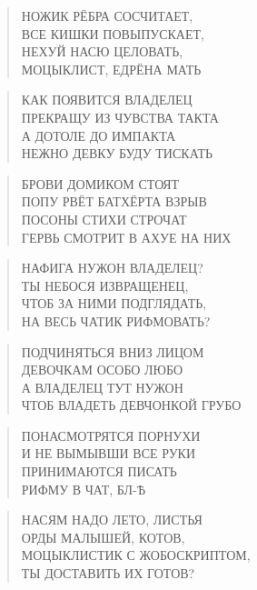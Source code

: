 \poemtitle{***}
\begin{verse}
НОЖИК РЁБРА СОСЧИТАЕТ,\\
ВСЕ КИШКИ ПОВЫПУСКАЕТ,\\
НЕХ⁠УЙ НАСЮ ЦЕЛОВАТЬ,\\
МОЦЫКЛИСТ, ЕДРЁНА МАТЬ
\end{verse}

\poemtitle{***}
\begin{verse}
КАК ПОЯВИТСЯ ВЛАДЕЛЕЦ\\
ПРЕКРАЩУ ИЗ ЧУВСТВА ТАКТА\\
А ДОТОЛЕ ДО ИМПАКТА\\
НЕЖНО ДЕВКУ БУДУ ТИСКАТЬ
\end{verse}

\poemtitle{***}
\begin{verse}
БРОВИ ДОМИКОМ СТОЯТ\\
ПОПУ РВЁТ БАТХЁРТА ВЗРЫВ\\
ПОСОНЫ СТИХИ СТРОЧАТ\\
ГЕРВЬ СМОТРИТ В АХУЕ НА НИХ
\end{verse}

\poemtitle{***}
\begin{verse}
НАФИГА НУЖОН ВЛАДЕЛЕЦ?\\
ТЫ НЕБОСЯ ИЗВРАЩЕНЕЦ,\\
ЧТОБ ЗА НИМИ ПОДГЛЯДАТЬ,\\
НА ВЕСЬ ЧАТИК РИФМОВАТЬ?
\end{verse}

\poemtitle{***}
\begin{verse}
ПОДЧИНЯТЬСЯ ВНИЗ ЛИЦОМ\\
ДЕВОЧКАМ ОСОБО ЛЮБО\\
А ВЛАДЕЛЕЦ ТУТ НУЖОН\\
ЧТОБ ВЛАДЕТЬ ДЕВЧОНКОЙ ГРУБО
\end{verse}

\poemtitle{***}
\begin{verse}
ПОНАСМОТРЯТСЯ ПОРНУХИ\\
И НЕ ВЫМЫВШИ ВСЕ РУКИ\\
ПРИНИМАЮТСЯ ПИСАТЬ\\
РИФМУ В ЧАТ, БЛ⁠-Ѣ
\end{verse}

\poemtitle{***}
\begin{verse}
НАСЯМ НАДО ЛЕТО, ЛИСТЬЯ\\
ОРДЫ МАЛЫШЕЙ, КОТОВ,\\
МОЦЫКЛИСТИК С ЖОБОСКРИПТОМ,\\
ТЫ ДОСТАВИТЬ ИХ ГОТОВ?
\end{verse}

